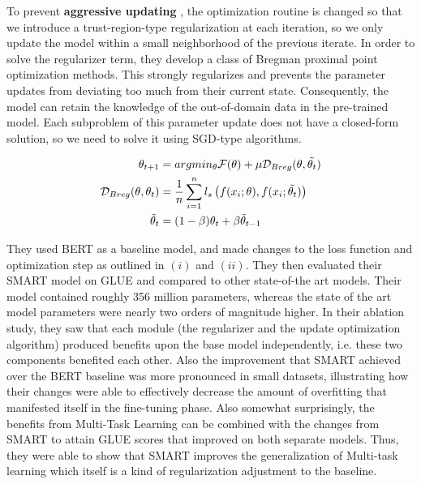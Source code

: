 \documentclass{article}
\begin{document}
    
To prevent \textbf{aggressive updating} , the optimization routine is changed so that we introduce a trust-region-type regularization at each iteration, so we only update the model within a small neighborhood of the previous iterate. In order to solve the regularizer term, they develop a class of Bregman proximal point optimization methods. This strongly regularizes and prevents the parameter updates from deviating too much from their current state. Consequently, the model can retain the knowledge of the out-of-domain data in the pre-trained model. Each subproblem of this parameter update does not have a closed-form solution, so we need to solve it using SGD-type algorithms. 

\begin{align*}
    \theta_{t+1} & = argmin_{\theta} \mathcal{F}(\theta) + \mu \mathcal{D}_{Breg}(\theta, \Tilde{\theta_{t}}) \\
    \mathcal{D}_{Breg}(\theta, \theta_{t}) & = \frac{1}{n} \sum_{i=1}^{n} l_{s} \left( f(x_{i}; \theta), f(x_{i}; \Tilde{\theta_{t}}) \right) \\
    \Tilde{\theta}_{t} & = (1 - \beta)\theta_{t} + \beta \Tilde{\theta}_{t-1}
\end{align*}

They used BERT as a baseline model, and made changes to the loss function and optimization step as outlined in $(i)$ and $(ii)$. They then evaluated their SMART model on GLUE and compared to other state-of-the art models. Their model contained roughly 356 million parameters, whereas the state of the art model parameters were nearly two orders of magnitude higher. In their ablation study, they saw that each module (the regularizer and the update optimization algorithm) produced benefits upon the base model independently, i.e. these two components benefited each other. Also the improvement that SMART achieved over the BERT baseline was more pronounced in small datasets, illustrating how their changes were able to effectively decrease the amount of overfitting that manifested itself in the fine-tuning phase. Also somewhat surprisingly, the benefits from Multi-Task Learning can be combined with the changes from SMART to attain GLUE scores that improved on both separate models. Thus, they were able to show that SMART improves the generalization of Multi-task learning which itself is a kind of regularization adjustment to the baseline.  
\end{document}
